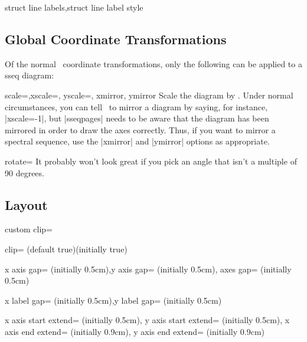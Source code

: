 \documentclass{ltxdoc}
\begin{document}
\begin{sseqdata}[name=ex1,degree={#1}{1-#1}]
\begin{keylist}{struct line labels,struct line label style}
\end{keylist}

\subsection{Global Coordinate Transformations}
Of the normal \tikzname\ coordinate transformations, only the following can be applied to a sseq diagram:
\begin{keylist}{scale=,xscale=, yscale=, xmirror, ymirror}
Scale the diagram by . Under normal circumstances, you can tell \tikzname\ to mirror a diagram by saying, for instance, |xscale=-1|, but |sseqpages| needs to be aware that the diagram has been mirrored in order to draw the axes correctly. Thus, if you want to mirror a spectral sequence, use the |xmirror| and |ymirror| options as appropriate.
\end{keylist}

\begin{key}{rotate=}
It probably won't look great if you pick an angle that isn't a multiple of 90 degrees.
\end{key}

\subsection{Layout}
\begin{key}{custom clip=}

\end{key}

\begin{key}{clip= (default true)(initially true)}

\end{key}

\begin{keylist}{x axis gap= (initially 0.5cm),y axis gap= (initially 0.5cm), axes gap= (initially 0.5cm)}

\end{keylist}


\begin{keylist}{x label gap= (initially 0.5cm),y label gap= (initially 0.5cm)}

\end{keylist}

\begin{keylist}{x axis start extend= (initially 0.5cm), y axis start extend= (initially 0.5cm),
                x axis end extend= (initially 0.9cm), y axis end extend= (initially 0.9cm)}


\end{keylist}
\end{sseqdata}
\end{document}
